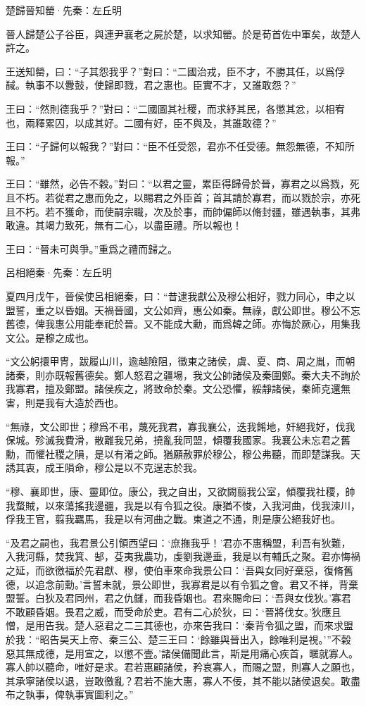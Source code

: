 \documentclass[12pt,a4paper]{ctexbook}
\begin{document}
楚歸晉知罃·先秦：左丘明 \par
晉人歸楚公子谷臣，與連尹襄老之屍於楚，以求知罃。於是荀首佐中軍矣，故楚人許之。\par
王送知罃，曰：“子其怨我乎？”對曰：“二國治戎，臣不才，不勝其任，以爲俘馘。執事不以釁鼓，使歸即戮，君之惠也。臣實不才，又誰敢怨？”\par
王曰：“然則德我乎？”對曰：“二國圖其社稷，而求紓其民，各懲其忿，以相宥也，兩釋累囚，以成其好。二國有好，臣不與及，其誰敢德？”\par
王曰：“子歸何以報我？”對曰：“臣不任受怨，君亦不任受德。無怨無德，不知所報。”\par
王曰：“雖然，必告不穀。”對曰：“以君之靈，累臣得歸骨於晉，寡君之以爲戮，死且不朽。若從君之惠而免之，以賜君之外臣首；首其請於寡君，而以戮於宗，亦死且不朽。若不獲命，而使嗣宗職，次及於事，而帥偏師以脩封疆，雖遇執事，其弗敢違。其竭力致死，無有二心，以盡臣禮。所以報也！\par
王曰：“晉未可與爭。”重爲之禮而歸之。\par
呂相絕秦·先秦：左丘明 \par
夏四月戊午，晉侯使呂相絕秦，曰：“昔逮我獻公及穆公相好，戮力同心，申之以盟誓，重之以昏姻。天禍晉國，文公如齊，惠公如秦。無祿，獻公即世。穆公不忘舊德，俾我惠公用能奉祀於晉。又不能成大勳，而爲韓之師。亦悔於厥心，用集我文公。是穆之成也。\par
“文公躬擐甲冑，跋履山川，逾越險阻，徵東之諸侯，虞、夏、商、周之胤，而朝諸秦，則亦既報舊德矣。鄭人怒君之疆埸，我文公帥諸侯及秦圍鄭。秦大夫不詢於我寡君，擅及鄭盟。諸侯疾之，將致命於秦。文公恐懼，綏靜諸侯，秦師克還無害，則是我有大造於西也。\par
“無祿，文公即世；穆爲不弔，蔑死我君，寡我襄公，迭我餚地，奸絕我好，伐我保城。殄滅我費滑，散離我兄弟，撓亂我同盟，傾覆我國家。我襄公未忘君之舊勳，而懼社稷之隕，是以有淆之師。猶願赦罪於穆公，穆公弗聽，而即楚謀我。天誘其衷，成王隕命，穆公是以不克逞志於我。\par
“穆、襄即世，康、靈即位。康公，我之自出，又欲闕翦我公室，傾覆我社稷，帥我蝥賊，以來蕩搖我邊疆，我是以有令狐之役。康猶不悛，入我河曲，伐我涑川，俘我王官，翦我羈馬，我是以有河曲之戰。東道之不通，則是康公絕我好也。\par
“及君之嗣也，我君景公引領西望曰：‘庶撫我乎！’君亦不惠稱盟，利吾有狄難，入我河縣，焚我箕、郜，芟夷我農功，虔劉我邊垂，我是以有輔氏之聚。君亦悔禍之延，而欲徼福於先君獻、穆，使伯車來命我景公曰：‘吾與女同好棄惡，復脩舊德，以追念前勳。’言誓未就，景公即世，我寡君是以有令狐之會。君又不祥，背棄盟誓。白狄及君同州，君之仇讎，而我昏姻也。君來賜命曰：‘吾與女伐狄。’寡君不敢顧昏姻。畏君之威，而受命於吏。君有二心於狄，曰：‘晉將伐女。’狄應且憎，是用告我。楚人惡君之二三其德也，亦來告我曰：‘秦背令狐之盟，而來求盟於我：“昭告昊天上帝、秦三公、楚三王曰：‘餘雖與晉出入，餘唯利是視。’”不榖惡其無成德，是用宣之，以懲不壹。’諸侯備聞此言，斯是用痛心疾首，暱就寡人。寡人帥以聽命，唯好是求。君若惠顧諸侯，矜哀寡人，而賜之盟，則寡人之願也，其承寧諸侯以退，豈敢徼亂？君若不施大惠，寡人不佞，其不能以諸侯退矣。敢盡布之執事，俾執事實圖利之。”\par
\end{document}
